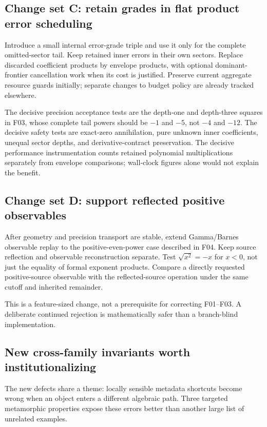 \subsection{Change set C: retain grades in flat product error scheduling}

Introduce a small internal error-grade triple and use it only for the complete omitted-sector tail. Keep retained inner errors in their own sectors. Replace discarded coefficient products by envelope products, with optional dominant-frontier cancellation work when its cost is justified. Preserve current aggregate resource guards initially; separate changes to budget policy are already tracked elsewhere.

The decisive precision acceptance tests are the depth-one and depth-three squares in F03, whose complete tail powers should be $-1$ and $-5$, not $-4$ and $-12$. The decisive safety tests are exact-zero annihilation, pure unknown inner coefficients, unequal sector depths, and derivative-contract preservation. The decisive performance instrumentation counts retained polynomial multiplications separately from envelope comparisons; wall-clock figures alone would not explain the benefit.

\subsection{Change set D: support reflected positive observables}

After geometry and precision transport are stable, extend Gamma/Barnes observable replay to the positive-even-power case described in F04. Keep source reflection and observable reconstruction separate. Test $\sqrt{x^2}=-x$ for $x<0$, not just the equality of formal exponent products. Compare a directly requested positive-source observable with the reflected-source operation under the same cutoff and inherited remainder.

This is a feature-sized change, not a prerequisite for correcting F01--F03. A deliberate continued rejection is mathematically safer than a branch-blind implementation.

\subsection{New cross-family invariants worth institutionalizing}

The new defects share a theme: locally sensible metadata shortcuts become wrong when an object enters a different algebraic path. Three targeted metamorphic properties expose these errors better than another large list of unrelated examples.


